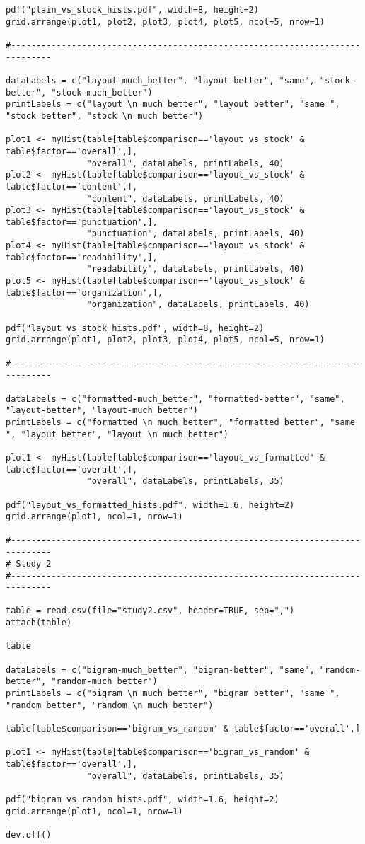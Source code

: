\documentclass{article}
\begin{document}
\begin{verbatim}
pdf("plain_vs_stock_hists.pdf", width=8, height=2)
grid.arrange(plot1, plot2, plot3, plot4, plot5, ncol=5, nrow=1)

#------------------------------------------------------------------------------

dataLabels = c("layout-much_better", "layout-better", "same", "stock-better", "stock-much_better")
printLabels = c("layout \n much better", "layout better", "same ", "stock better", "stock \n much better")

plot1 <- myHist(table[table$comparison=='layout_vs_stock' & table$factor=='overall',],
                "overall", dataLabels, printLabels, 40)
plot2 <- myHist(table[table$comparison=='layout_vs_stock' & table$factor=='content',],
                "content", dataLabels, printLabels, 40)
plot3 <- myHist(table[table$comparison=='layout_vs_stock' & table$factor=='punctuation',],
                "punctuation", dataLabels, printLabels, 40)
plot4 <- myHist(table[table$comparison=='layout_vs_stock' & table$factor=='readability',],
                "readability", dataLabels, printLabels, 40)
plot5 <- myHist(table[table$comparison=='layout_vs_stock' & table$factor=='organization',],
                "organization", dataLabels, printLabels, 40)

pdf("layout_vs_stock_hists.pdf", width=8, height=2)
grid.arrange(plot1, plot2, plot3, plot4, plot5, ncol=5, nrow=1)

#------------------------------------------------------------------------------

dataLabels = c("formatted-much_better", "formatted-better", "same", "layout-better", "layout-much_better")
printLabels = c("formatted \n much better", "formatted better", "same ", "layout better", "layout \n much better")

plot1 <- myHist(table[table$comparison=='layout_vs_formatted' & table$factor=='overall',],
                "overall", dataLabels, printLabels, 35)

pdf("layout_vs_formatted_hists.pdf", width=1.6, height=2)
grid.arrange(plot1, ncol=1, nrow=1)

#------------------------------------------------------------------------------
# Study 2
#------------------------------------------------------------------------------

table = read.csv(file="study2.csv", header=TRUE, sep=",")
attach(table)

table

dataLabels = c("bigram-much_better", "bigram-better", "same", "random-better", "random-much_better")
printLabels = c("bigram \n much better", "bigram better", "same ", "random better", "random \n much better")

table[table$comparison=='bigram_vs_random' & table$factor=='overall',]

plot1 <- myHist(table[table$comparison=='bigram_vs_random' & table$factor=='overall',],
                "overall", dataLabels, printLabels, 35)

pdf("bigram_vs_random_hists.pdf", width=1.6, height=2)
grid.arrange(plot1, ncol=1, nrow=1)

dev.off()


\end{verbatim}
\end{document}
